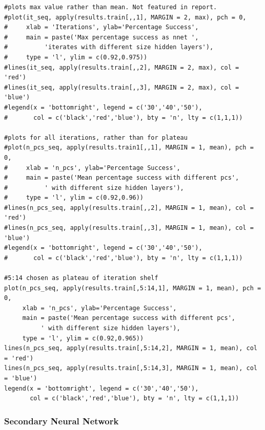 \documentclass[11pt]{article} %
\begin{document}
\begin{lstlisting}
#plots max value rather than mean. Not featured in report.
#plot(it_seq, apply(results.train[,,1], MARGIN = 2, max), pch = 0, 
#     xlab = 'Iterations', ylab='Percentage Success', 
#     main = paste('Max percentage success as nnet ', 
#          'iterates with different size hidden layers'), 
#     type = 'l', ylim = c(0.92,0.975))
#lines(it_seq, apply(results.train[,,2], MARGIN = 2, max), col = 'red')
#lines(it_seq, apply(results.train[,,3], MARGIN = 2, max), col = 'blue')
#legend(x = 'bottomright', legend = c('30','40','50'), 
#       col = c('black','red','blue'), bty = 'n', lty = c(1,1,1))

#plots for all iterations, rather than for plateau
#plot(n_pcs_seq, apply(results.train1[,,1], MARGIN = 1, mean), pch = 0, 
#     xlab = 'n_pcs', ylab='Percentage Success', 
#     main = paste('Mean percentage success with different pcs',
#          ' with different size hidden layers'), 
#     type = 'l', ylim = c(0.92,0.96))
#lines(n_pcs_seq, apply(results.train[,,2], MARGIN = 1, mean), col = 'red')
#lines(n_pcs_seq, apply(results.train[,,3], MARGIN = 1, mean), col = 'blue')
#legend(x = 'bottomright', legend = c('30','40','50'), 
#       col = c('black','red','blue'), bty = 'n', lty = c(1,1,1))

#5:14 chosen as plateau of iteration shelf
plot(n_pcs_seq, apply(results.train[,5:14,1], MARGIN = 1, mean), pch = 0, 
     xlab = 'n_pcs', ylab='Percentage Success', 
     main = paste('Mean percentage success with different pcs',
          ' with different size hidden layers'), 
     type = 'l', ylim = c(0.92,0.965))
lines(n_pcs_seq, apply(results.train[,5:14,2], MARGIN = 1, mean), col = 'red')
lines(n_pcs_seq, apply(results.train[,5:14,3], MARGIN = 1, mean), col = 'blue')
legend(x = 'bottomright', legend = c('30','40','50'), 
       col = c('black','red','blue'), bty = 'n', lty = c(1,1,1))

\end{lstlisting}

\vspace{5mm}
\subsubsection{Secondary Neural Network}
\label{code-sec_nnet}
\end{document}
